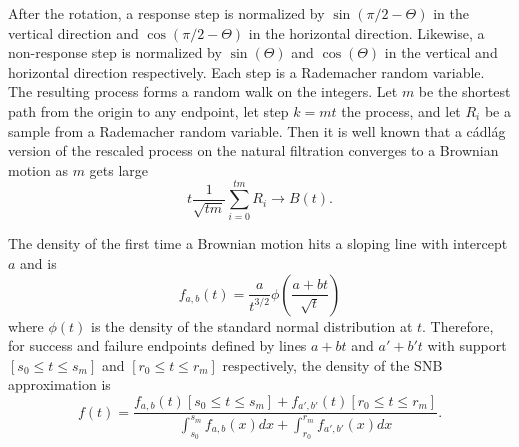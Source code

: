 \documentclass[12pt]{article}
\begin{document}
After the rotation, a response step is normalized by $\sin(\pi/2-\Theta)$ in the
vertical direction and $\cos(\pi/2 - \Theta)$ in the horizontal direction.
Likewise, a non-response step is normalized by $\sin(\Theta)$ and
$\cos(\Theta)$ in the vertical and horizontal direction respectively. Each
step is a Rademacher random variable. The
resulting process forms a random walk on the integers. Let $m$ be the
shortest path from the origin to any endpoint, let step $k=mt$
the process, and let $R_i$ be a sample from a Rademacher random variable. Then
it is well known that a c\'{a}dl\'{a}g version of the rescaled process on the
natural filtration converges to a Brownian motion as $m$ gets large
\begin{equation*}
t \frac{1}{\sqrt{t m}} \sum_{i=0}^{t m} R_i \rightarrow
B(t).
\end{equation*}

The density of the first time a Brownian motion hits a sloping line with
intercept $a$ and is \cite{Bachelier1900}
\begin{equation}
f_{a,b}(t) = \frac{a}{t^{3/2}} \phi \left(\frac{a + bt}{\sqrt{t}} \right)
\end{equation}
where $\phi(t)$ is the density of the standard normal distribution at $t$.
Therefore, for success and failure endpoints defined by lines 
$a + bt$ and $a' + b't$ with support $[s_0 \leq t \leq s_m]$ and 
$[r_0 \leq t \leq r_m]$ respectively, the density of the SNB approximation
is 
\begin{equation}
f(t) = \frac{ f_{a,b}(t)[s_0 \leq t \leq s_m] + 
  f_{a',b'}(t)[r_0 \leq t \leq r_m]}{
  \int_{s_0}^{s_m} f_{a,b}(x) dx + \int_{r_0}^{r_m} f_{a',b'}(x) dx}.
\end{equation}




\end{document}
